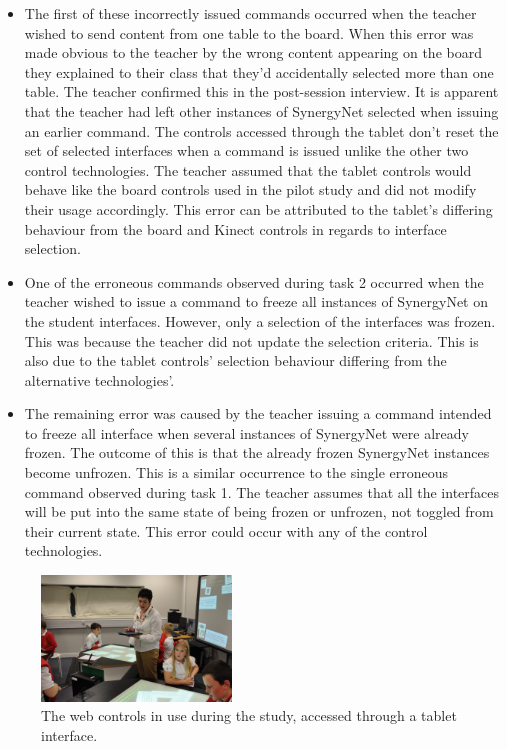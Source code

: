 \documentclass[link]{IWCOMP}
\begin{document}
\begin{itemize}
\item The first of these incorrectly issued commands occurred when the teacher wished to send content from one table to the board.
When this error was made obvious to the teacher by the wrong content appearing on the board they explained to their class that they'd accidentally selected more than one table.
The teacher confirmed this in the post-session interview.
It is apparent that the teacher had left other instances of SynergyNet selected when issuing an earlier command.
The controls accessed through the tablet don't reset the set of selected interfaces when a command is issued unlike the other two control technologies.
The teacher assumed that the tablet controls would behave like the board controls used in the pilot study and did not modify their usage accordingly.
This error can be attributed to the tablet's differing behaviour from the board and Kinect controls in regards to interface selection.

\item One of the erroneous commands observed during task 2 occurred when the teacher wished to issue a command to freeze all instances of SynergyNet on the student interfaces.
However, only a selection of the interfaces was frozen.
This was because the teacher did not update the selection criteria.
This is also due to the tablet controls' selection behaviour differing from the alternative technologies'.

\item The remaining error was caused by the teacher issuing a command intended to freeze all interface when several instances of SynergyNet were already frozen.
The outcome of this is that the already frozen SynergyNet instances become unfrozen.
This is a similar occurrence to the single erroneous command observed during task 1.
The teacher assumes that all the interfaces will be put into the same state of being frozen or unfrozen, not toggled from their current state.
This error could occur with any of the control technologies.
\end{itemize}

\begin{figure}[h]
   \centering
   \includegraphics[width=0.45\textwidth]{figures/study_tablet.png}
   \caption{The web controls in use during the study, accessed through a tablet interface.}
   \label{fig:studyTablet}
\end{figure}
\end{document}
